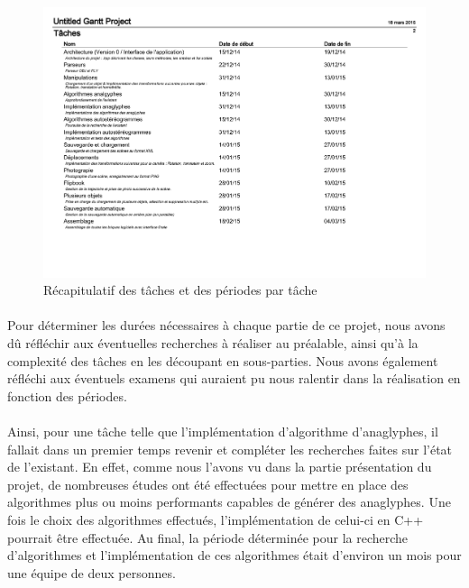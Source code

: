 \begin{figure}[h]
	\centering
	\includegraphics[scale=0.6]{gantp.pdf}
	\caption{\label{fig:gantP} Récapitulatif des tâches et des périodes par tâche \protect \footnotemark }
\end{figure}

\paragraph{}
Pour déterminer les durées nécessaires à chaque partie de ce projet, nous avons dû réfléchir aux éventuelles recherches à réaliser au préalable, ainsi qu'à la complexité des tâches en les découpant en sous-parties. Nous avons également réfléchi aux éventuels examens qui auraient pu nous ralentir dans la réalisation en fonction des périodes.

\paragraph{}
Ainsi, pour une tâche telle que l'implémentation d'algorithme d'anaglyphes, il fallait dans un premier temps revenir et compléter les recherches faites sur l'état de l'existant. En effet, comme nous l'avons vu dans la partie présentation du projet, de nombreuses études ont été effectuées pour mettre en place des algorithmes plus ou moins performants capables de générer des anaglyphes. Une fois le choix des algorithmes effectués, l'implémentation de celui-ci en C++ pourrait être effectuée.
Au final, la période déterminée pour la recherche d'algorithmes et l'implémentation de ces algorithmes était d'environ un mois pour une équipe de deux personnes.

